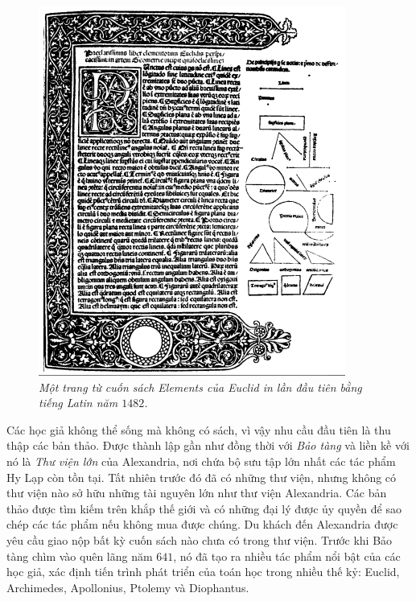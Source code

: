 \begin{multicols}{2}
	\begin{figure}[H]
		\vspace*{-10pt}
		\centering
		\captionsetup{labelformat= empty, justification=centering}
		\includegraphics[width= 1\linewidth]{2}
		\caption{\small\textit{\color{lichsutoanhoc}Một trang từ cuốn sách Elements của Euclid in lần đầu tiên bằng tiếng Latin năm $1482$.}}
		\vspace*{-10pt}
	\end{figure} 
	Các học giả không thể sống mà không có sách, vì vậy nhu cầu đầu tiên là thu thập các bản thảo. Được thành lập gần như đồng thời với \textit{Bảo tàng} và liền kề với nó là \textit{Thư viện lớn} của Alexandria, nơi chứa bộ sưu tập lớn nhất các tác phẩm Hy Lạp còn tồn tại. Tất nhiên trước đó đã có những thư viện, nhưng không có thư viện nào sở hữu những tài nguyên lớn như thư viện Alexandria. Các bản thảo được tìm kiếm trên khắp thế giới và có những đại lý được ủy quyền để sao chép các tác phẩm nếu không mua được chúng. Du khách đến Alexandria được yêu cầu giao nộp bất kỳ cuốn sách nào chưa có trong thư viện.
	\vskip 0.1cm
	Trước khi Bảo tàng chìm vào quên lãng năm $641$, nó đã tạo ra nhiều tác phẩm nổi bật của các học giả, xác định tiến trình phát triển của toán học trong nhiều thế kỷ: Euclid, Archimedes, Apollonius, Ptolemy và Diophantus.

\end{multicols}
